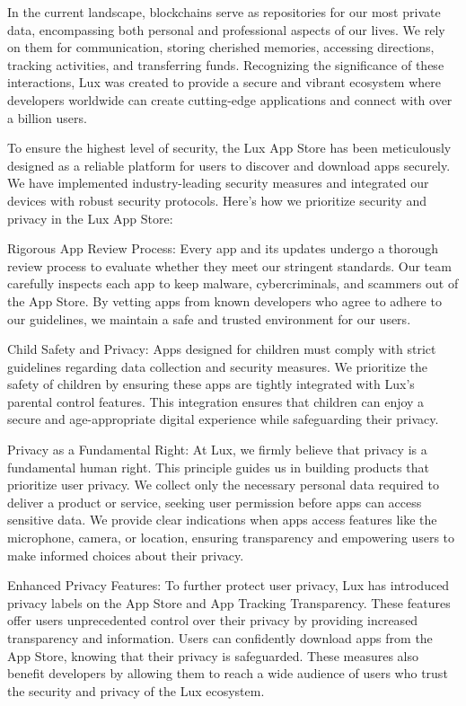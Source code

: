 \documentclass[11pt]{article}
\begin{document}
In the current landscape, blockchains serve as repositories for our most private data, encompassing both personal and professional aspects of our lives. We rely on them for communication, storing cherished memories, accessing directions, tracking activities, and transferring funds. Recognizing the significance of these interactions, Lux was created to provide a secure and vibrant ecosystem where developers worldwide can create cutting-edge applications and connect with over a billion users.


To ensure the highest level of security, the Lux App Store has been meticulously designed as a reliable platform for users to discover and download apps securely. We have implemented industry-leading security measures and integrated our devices with robust security protocols. Here's how we prioritize security and privacy in the Lux App Store:


Rigorous App Review Process: Every app and its updates undergo a thorough review process to evaluate whether they meet our stringent standards. Our team carefully inspects each app to keep malware, cybercriminals, and scammers out of the App Store. By vetting apps from known developers who agree to adhere to our guidelines, we maintain a safe and trusted environment for our users.


Child Safety and Privacy: Apps designed for children must comply with strict guidelines regarding data collection and security measures. We prioritize the safety of children by ensuring these apps are tightly integrated with Lux's parental control features. This integration ensures that children can enjoy a secure and age-appropriate digital experience while safeguarding their privacy.


Privacy as a Fundamental Right: At Lux, we firmly believe that privacy is a fundamental human right. This principle guides us in building products that prioritize user privacy. We collect only the necessary personal data required to deliver a product or service, seeking user permission before apps can access sensitive data. We provide clear indications when apps access features like the microphone, camera, or location, ensuring transparency and empowering users to make informed choices about their privacy.


Enhanced Privacy Features: To further protect user privacy, Lux has introduced privacy labels on the App Store and App Tracking Transparency. These features offer users unprecedented control over their privacy by providing increased transparency and information. Users can confidently download apps from the App Store, knowing that their privacy is safeguarded. These measures also benefit developers by allowing them to reach a wide audience of users who trust the security and privacy of the Lux ecosystem.
\end{document}
